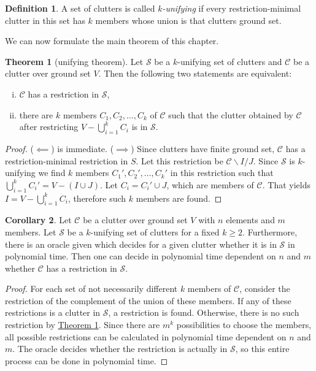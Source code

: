 \documentclass[a4paper, 12pt]{scrbook}
\theoremstyle{definition}
\newtheorem*{definition}{Definition}
\newtheorem{theorem}{Theorem}[chapter]
\newtheorem{corollary}[theorem]{Corollary}
\begin{document}
   \begin{definition}
       A set of clutters is called \emph{$k$-unifying} if every restriction-minimal clutter in this set has $k$ members whose union is that clutters ground set.
   \end{definition}

   We can now formulate the main theorem of this chapter.

   \begin{theorem}[unifying theorem]\label{unifying}
       Let $\mathcal{S}$ be a $k$-unifying set of clutters and $\mathcal{C}$ be a clutter over ground set $V$.
       Then the following two statements are equivalent:
       \leavevmode
       \begin{enumerate}[(i)]
           \item $\mathcal{C}$ has a restriction in $\mathcal{S}$,
           \item there are $k$ members $C_1, C_2, \ldots, C_k$ of $\mathcal{C}$ such that the clutter obtained by $\mathcal{C}$ after restricting $V - \bigcup_{i=1}^k C_i$ is in $\mathcal{S}$.
       \end{enumerate}
   \end{theorem}

   \begin{proof}
       ($\impliedby$) is immediate.
       ($\implies$) Since clutters have finite ground set, $\mathcal{C}$ has a restriction-minimal restriction in $S$.
       Let this restriction be $\mathcal{C}\backslash I / J$.
       Since $\mathcal{S}$ is $k$-unifying we find $k$ members $C_1', C_2', \ldots, C_k'$ in this restriction such that $\bigcup_{i=1}^k C_i' = V - (I \cup J)$.
       Let $C_i = C_i' \cup J$, which are members of $\mathcal{C}$.
       That yields $I=V-\bigcup_{i=1}^k C_i$, therefore such $k$ members are found.
   \end{proof}
   \begin{corollary}
       Let $\mathcal{C}$ be a clutter over ground set $V$ with $n$ elements and $m$ members.
       Let $\mathcal{S}$ be a $k$-unifying set of clutters for a fixed $k\geq 2$.
       Furthermore, there is an oracle given which decides for a given clutter whether it is in $\mathcal{S}$ in polynomial time.
       Then one can decide in polynomial time dependent on $n$ and $m$ whether $\mathcal{C}$ has a restriction in $\mathcal{S}$.
   \end{corollary}

   \begin{proof}
       For each set of not necessarily different $k$ members of $\mathcal{C}$, consider the restriction of the complement of the union of these members.
       If any of these restrictions is a clutter in $\mathcal{S}$, a restriction is found.
       Otherwise, there is no such restriction by \hyperref[unifying]{Theorem \ref*{unifying}}.
       Since there are $m^k$ possibilities to choose the members, all possible restrictions can be calculated in polynomial time dependent on $n$ and $m$. The oracle decides whether the restriction is actually in $\mathcal{S}$, so this entire process can be done in polynomial time.
   \end{proof}
\end{document}
